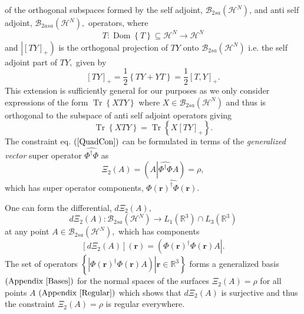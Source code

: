 \documentclass[aps,preprint]{revtex4}%
\begin{document}
of the orthogonal subspaces formed by the self adjoint, $\mathcal{B}%
_{2sa}\left(  \mathcal{H}^{N}\right)  $, and anti self adjoint, $\mathcal{B}%
_{2asa}\left(  \mathcal{H}^{N}\right)  ,$ operators, where
\begin{equation}
T:\operatorname{Dom}\left\{  T\right\}  \subseteq\mathcal{H}^{N}%
\rightarrow\mathcal{H}^{N}%
\end{equation}
and $\left\vert \left[  TY\right]  _{+}\right)  $ is the orthogonal projection
of $TY$ onto $\mathcal{B}_{2sa}\left(  \mathcal{H}^{N}\right)  $ i.e. the self
adjoint part of $TY,$ given by
\[
\left[  TY\right]  _{+}=\frac{1}{2}\left\{  TY+YT\right\}  =\frac{1}{2}\left[
T,Y\right]  _{+}.
\]
This extension is sufficiently general for our purposes as we only consider
expressions of the form $\operatorname{Tr}\left\{  XTY\right\}  $ where
$X\in\mathcal{B}_{2sa}\left(  \mathcal{H}^{N}\right)  $ and thus is orthogonal
to the subspace of anti self adjoint operators giving
\begin{equation}
\operatorname{Tr}\left\{  XTY\right\}  =\operatorname{Tr}\left\{  X\left[
TY\right]  _{+}\right\}  .
\end{equation}
The constraint eq. $\left(  \ref{QuadCon}\right)  $ can be formulated in terms
of the \emph{generalized} \emph{vector} super operator $\widehat{\Phi
^{\dagger}\Phi}$ as%
\begin{equation}
\Xi_{2}\left(  A\right)  =\left(  A\left\vert \widehat{\Phi^{\dagger}\Phi
}A\right.  \right)  =\rho,
\end{equation}
which has super operator components, $\widehat{\Phi\left(  \boldsymbol{r}%
\right)  ^{\dagger}\Phi\left(  \boldsymbol{r}\right)  }$.

One can form the differential, $d\Xi_{2}\left(  A\right)  ,$ \cite{Encyclo}
\begin{equation}
d\Xi_{2}\left(  A\right)  :\mathcal{B}_{2sa}\left(  \mathcal{H}^{N}\right)
\rightarrow L_{1}\left(  \mathbb{R}^{3}\right)  \cap L_{3}\left(
\mathbb{R}^{3}\right)
\end{equation}
at any point $A\in\mathcal{B}_{2sa}\left(  \mathcal{H}^{N}\right)  ,$ which
has components
\begin{equation}
\left[  d\Xi_{2}\left(  A\right)  \right]  \left(  \boldsymbol{r}\right)
=\left(  \Phi\left(  \boldsymbol{r}\right)  ^{\dagger}\Phi\left(
\boldsymbol{r}\right)  A\right\vert .
\end{equation}
The set of operators $\left\{  \left.  \left\vert \Phi\left(  \boldsymbol{r}%
\right)  ^{\dagger}\Phi\left(  \boldsymbol{r}\right)  A\right)  \right\vert
\boldsymbol{r\in}\mathbb{R}^{3}\right\}  $ forms a generalized basis $\left(
\text{Appendix \ref{Bases}}\right)  $ for the normal spaces of the surfaces
$\Xi_{2}\left(  A\right)  =\rho$ for all points $A$ $\left(  \text{Appendix
\ref{Regular}}\right)  $ which shows that $d\Xi_{2}\left(  A\right)  $ is
surjective \cite{Encyclo} and thus the constraint $\Xi_{2}\left(  A\right)
=\rho$ is regular \cite{Hestenes75} everywhere.
\end{document}
